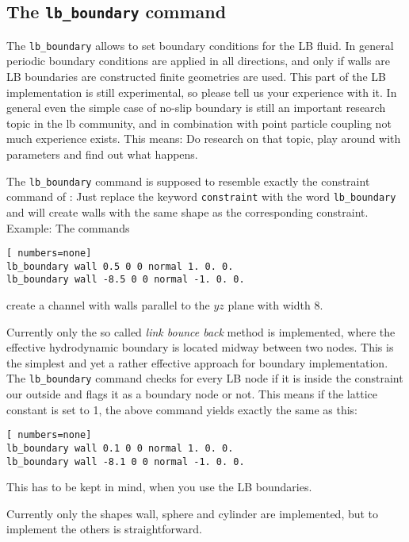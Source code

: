 \subsection*{The \lstinline|lb_boundary| command}
The \lstinline|lb_boundary| allows to set boundary conditions for the LB fluid. In general
periodic boundary conditions are applied in all directions, and only if walls are LB boundaries
are constructed finite geometries are used. This part of the LB implementation is still experimental,
so please tell us your experience with it. In general even the simple case of no-slip
boundary is still an important research topic in the lb community, and in combination with
point particle coupling not much experience exists. This means: Do research on that topic, play
around with parameters and find out what happens. 


The \lstinline|lb_boundary| command is supposed to resemble exactly the constraint command of 
\ES{}: Just replace the keyword \lstinline|constraint| with the word \lstinline|lb_boundary| 
and \ES{} will create walls with the same shape as the corresponding constraint. Example:
The commands
\begin{lstlisting}[ numbers=none]
lb_boundary wall 0.5 0 0 normal 1. 0. 0. 
lb_boundary wall -8.5 0 0 normal -1. 0. 0. 
\end{lstlisting}
create a channel with walls parallel to the $yz$ plane with width 8.

Currently only the so called \emph{link bounce back} method is implemented, where the effective
hydrodynamic boundary is located midway between two nodes. This is the simplest and yet a 
rather effective approach for boundary implementation. The \lstinline|lb_boundary| command
checks for every LB node if it is inside the constraint our outside and flags it as a boundary
node or not. This means if the lattice constant is set to 1, the above command yields exactly
the same as this:
\begin{lstlisting}[ numbers=none]
lb_boundary wall 0.1 0 0 normal 1. 0. 0. 
lb_boundary wall -8.1 0 0 normal -1. 0. 0. 
\end{lstlisting}
This has to be kept in mind, when you use the LB boundaries.

Currently only the shapes wall, sphere and cylinder are implemented, but to implement the others 
is straightforward.
